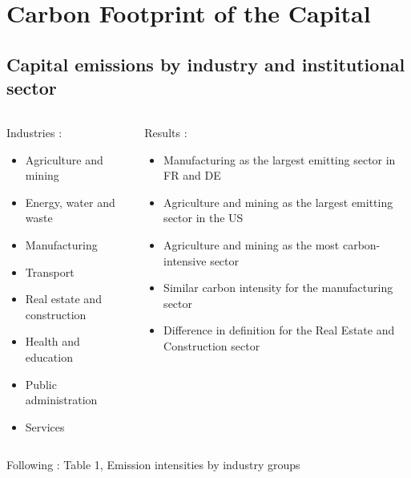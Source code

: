 \documentclass[10pt]{beamer}
\newcommand\ReduceFont{\fontsize{10}{7.2}\selectfont}
\begin{document}
\section{Carbon Footprint of the Capital}
\begin{frame}{\secname}
    \tableofcontents[currentsection, hideothersubsections, sections=\value{section}]
\end{frame}

\subsection{Capital emissions by industry and institutional sector}

\begin{frame}{\subsecname}
    \begin{columns}
        \begin{column}{0.5\textwidth}
            Industries :
                \begin{itemize}
                    \item Agriculture and mining
                    \item Energy, water and waste
                    \item Manufacturing
                    \item Transport
                    \item Real estate and construction
                    \item Health and education
                    \item Public administration
                    \item Services
                \end{itemize}
        \end{column}
        \begin{column}{0.5\textwidth}
            \ReduceFont
            Results : 
                \begin{itemize}
                    \item Manufacturing as the largest emitting sector in FR and DE
                    \item Agriculture and mining as the largest emitting sector in the US
                    \item Agriculture and mining as the most carbon-intensive sector
                    \item Similar carbon intensity for the manufacturing sector
                    \item Difference in definition for the Real Estate and Construction sector
                \end{itemize}    
        \end{column}
    \end{columns}
    \hfill \break
    Following : Table 1, Emission intensities by industry groups
\end{frame}
\end{document}
